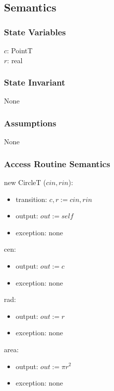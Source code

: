 \documentclass[12pt,fleqn]{article}
\begin{document}
\subsection* {Semantics}

\subsubsection* {State Variables}

$c$: PointT\\
$r$: real

\subsubsection* {State Invariant}
None

\subsubsection* {Assumptions}
None

\subsubsection* {Access Routine Semantics}

\noindent new CircleT ($\mathit{cin}, \mathit{rin}$):
\begin{itemize}
\item transition: $c, r := \mathit{cin}, \mathit{rin}$
\item output: $out := \mathit{self}$
\item exception: none
\end{itemize}

\noindent cen:
\begin{itemize}
\item output: $out := c$
\item exception: none
\end{itemize}

\noindent rad:
\begin{itemize}
\item output: $out := r$
\item exception: none
\end{itemize}

\noindent area:
\begin{itemize}
\item output: $out := \pi r^2$
\item exception: none
\end{itemize}
\end{document}
